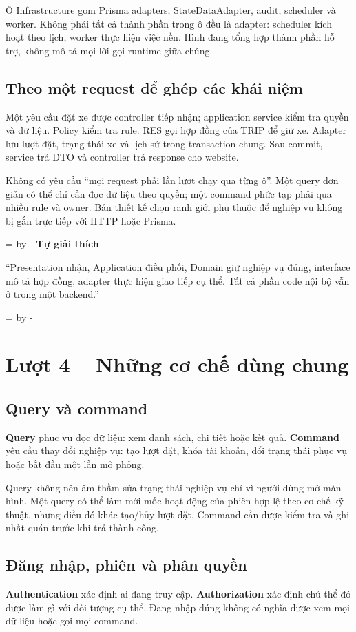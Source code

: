 \documentclass[12pt,a4paper]{article}
\newcommand{\Needspace}[1]{%
  \par\begingroup\dimen0=\pagegoal\advance\dimen0 by -\pagetotal
  \ifdim\dimen0<#1\relax\newpage\fi\endgroup}
\newcommand{\Lesson}[1]{\par\bigskip\Needspace{0.52\textheight}\section{#1}}
\newcommand{\Point}[1]{\par\medskip\Needspace{4\baselineskip}\noindent\textbf{#1}\par\nobreak\smallskip}
\newcommand{\Term}[1]{\textbf{#1}}
\begin{document}
Ô Infrastructure gom Prisma adapters, StateDataAdapter, audit, scheduler và worker. Không phải tất cả thành phần trong ô đều là adapter: scheduler kích hoạt theo lịch, worker thực hiện việc nền. Hình đang tổng hợp thành phần hỗ trợ, không mô tả mọi lời gọi runtime giữa chúng.

\subsection{Theo một request để ghép các khái niệm}
Một yêu cầu đặt xe được controller tiếp nhận; application service kiểm tra quyền và dữ liệu. Policy kiểm tra rule. RES gọi hợp đồng của TRIP để giữ xe. Adapter lưu lượt đặt, trạng thái xe và lịch sử trong transaction chung. Sau commit, service trả DTO và controller trả response cho website.

Không có yêu cầu ``mọi request phải lần lượt chạy qua từng ô''. Một query đơn giản có thể chỉ cần đọc dữ liệu theo quyền; một command phức tạp phải qua nhiều rule và owner. Bản thiết kế chọn ranh giới phụ thuộc để nghiệp vụ không bị gắn trực tiếp với HTTP hoặc Prisma.

\Point{Tự giải thích}
``Presentation nhận, Application điều phối, Domain giữ nghiệp vụ đúng, interface mô tả hợp đồng, adapter thực hiện giao tiếp cụ thể. Tất cả phần code nội bộ vẫn ở trong một backend.''

\Lesson{Lượt 4 -- Những cơ chế dùng chung}
\subsection{Query và command}
\Term{Query} phục vụ đọc dữ liệu: xem danh sách, chi tiết hoặc kết quả. \Term{Command} yêu cầu thay đổi nghiệp vụ: tạo lượt đặt, khóa tài khoản, đổi trạng thái phục vụ hoặc bắt đầu một lần mô phỏng.

Query không nên âm thầm sửa trạng thái nghiệp vụ chỉ vì người dùng mở màn hình. Một query có thể làm mới mốc hoạt động của phiên hợp lệ theo cơ chế kỹ thuật, nhưng điều đó khác tạo/hủy lượt đặt. Command cần được kiểm tra và ghi nhất quán trước khi trả thành công.

\subsection{Đăng nhập, phiên và phân quyền}
\Term{Authentication} xác định ai đang truy cập. \Term{Authorization} xác định chủ thể đó được làm gì với đối tượng cụ thể. Đăng nhập đúng không có nghĩa được xem mọi dữ liệu hoặc gọi mọi command.
\end{document}
